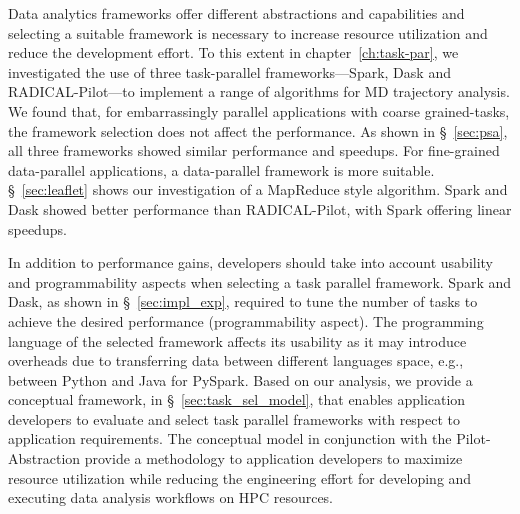 Data analytics frameworks offer different abstractions and capabilities and
selecting a suitable framework is necessary to increase resource
utilization and reduce the development effort.
To this extent in chapter~\ref{ch:task-par}, we investigated the
use of three task-parallel frameworks---Spark, Dask and RADICAL-Pilot---to
implement a range of algorithms for MD trajectory analysis.
We found that, for embarrassingly parallel applications with coarse 
grained-tasks, the framework selection does not affect the performance.
As shown in \S~\ref{sec:psa}, all three frameworks showed similar
performance and speedups. For fine-grained data-parallel applications, a 
data-parallel framework is more suitable. \S~\ref{sec:leaflet} shows our
investigation of a MapReduce style algorithm. Spark and Dask showed better
performance than RADICAL-Pilot, with Spark offering linear speedups.

In addition to performance gains, developers should take 
into account usability and programmability aspects when selecting a 
task parallel framework. Spark and 
Dask, as shown in \S~\ref{sec:impl_exp}, required to tune the number of 
tasks to achieve the desired performance (programmability aspect). The 
programming language of the selected framework affects its usability as
it may introduce overheads due to transferring data between different
languages space, e.g., between Python and Java for PySpark.
Based on our analysis, we provide a conceptual framework, in 
\S~\ref{sec:task_sel_model}, that enables application developers to 
evaluate and select task parallel frameworks with respect to application 
requirements. The conceptual model in conjunction with the
Pilot-Abstraction provide a methodology to application developers to
maximize resource utilization while reducing the engineering effort
for developing and executing data analysis workflows on HPC resources.

